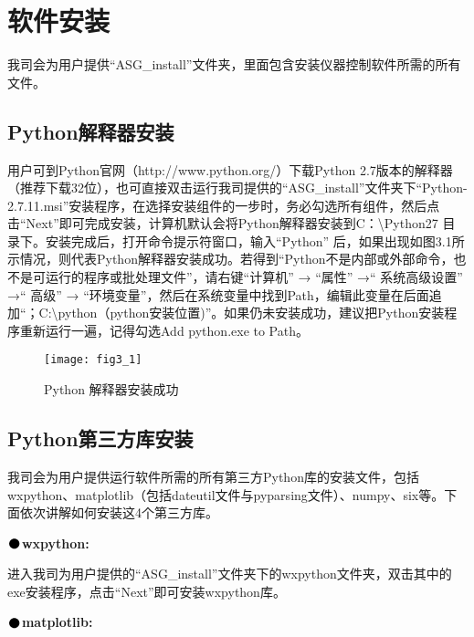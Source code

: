 \pagestyle{fancy}
\chapter{\heiti 软件安装}
\setmainfont{Times New Roman}

我司会为用户提供“ASG\_install”文件夹，里面包含安装仪器控制软件所需的所有文件。

\section{Python\heiti 解释器安装}
用户可到Python官网（http://www.python.org/）下载Python 2.7版本的解释器（推荐下载32位），也可直接双击运行我司提供的“ASG\_install”文件夹下“Python-2.7.11.msi”安装程序，在选择安装组件的一步时，务必勾选所有组件，然后点击“Next”即可完成安装，计算机默认会将Python解释器安装到C：\textbackslash Python27 目录下。安装完成后，打开命令提示符窗口，输入“Python” 后，如果出现如图3.1所示情况，则代表Python解释器安装成功。若得到“Python不是内部或外部命令，也不是可运行的程序或批处理文件”，请右键“计算机” → “属性” →“ 系统高级设置” →“ 高级” → “环境变量”，然后在系统变量中找到Path，编辑此变量在后面追加“；C:\textbackslash python（python安装位置)”。如果仍未安装成功，建议把Python安装程序重新运行一遍，记得勾选Add python.exe to Path。
\begin{figure}[ht]
\centering
\texttt{[image: fig3\_1]}
\caption{Python 解释器安装成功}
\end{figure}

\section{Python\heiti 第三方库安装}
我司会为用户提供运行软件所需的所有第三方Python库的安装文件，包括wxpython、matplotlib（包括dateutil文件与pyparsing文件）、numpy、six等。下面依次讲解如何安装这4个第三方库。
\vspace{0.4cm}

\noindent$\vcenter{\hbox{\huge$\bullet$}}$\quad\fontsize{12pt}{\baselineskip}\textbf{wxpython:}

进入我司为用户提供的“ASG\_install”文件夹下的wxpython文件夹，双击其中的exe安装程序，点击“Next”即可安装wxpython库。
\vspace{0.4cm}

\noindent$\vcenter{\hbox{\huge$\bullet$}}$\quad\fontsize{12pt}{\baselineskip}\textbf{matplotlib:}

